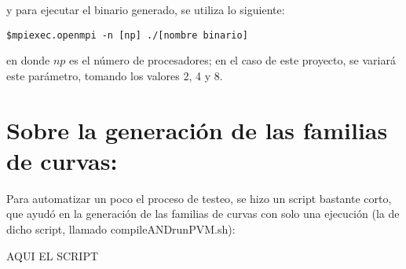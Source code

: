 \documentclass[letter]{article}
\begin{document}
y para ejecutar el binario generado, se utiliza lo siguiente:

\begin{lstlisting}
$mpiexec.openmpi -n [np] ./[nombre binario]
\end{lstlisting}

en donde $\displaystyle np$ es el número de procesadores; en el caso de este proyecto, se variará este parámetro, tomando los valores 2, 4 y 8.


\section{\normalsize Sobre la generación de las familias de curvas:}

Para automatizar un poco el proceso de testeo, se hizo un script bastante corto, que ayudó en la generación de las familias de curvas con solo una ejecución (la de dicho script, llamado compileANDrunPVM.sh):


AQUI EL SCRIPT
\end{document}
